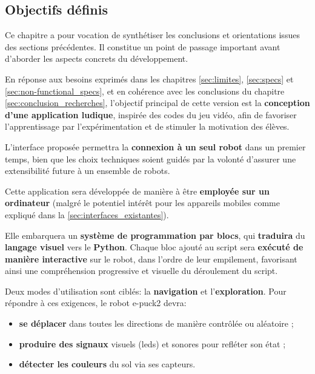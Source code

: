 \subsection{Objectifs définis} \label{sec:objectifs_finaux}

Ce chapitre a pour vocation de synthétiser les conclusions et orientations issues des sections précédentes. 
Il constitue un point de passage important avant d’aborder les aspects concrets du développement.

En réponse aux besoins exprimés dans les chapitres \ref{sec:limites}, \ref{sec:specs} et \ref{sec:non-functional_specs}, et en cohérence avec les conclusions du chapitre \ref{sec:conclusion_recherches}, l’objectif principal de cette version est la \textbf{conception d’une application ludique}, inspirée des codes du jeu vidéo, afin de favoriser l’apprentissage par l’expérimentation et de stimuler la motivation des élèves.

L’interface proposée permettra la \textbf{connexion à un seul robot} dans un premier temps, bien que les choix techniques soient guidés par la volonté d’assurer une extensibilité future à un ensemble de robots.

Cette application sera développée de manière à être \textbf{employée sur un ordinateur} (malgré le potentiel intérêt pour les appareils mobiles comme expliqué dans la \autoref{sec:interfaces_existantes}).

Elle embarquera un \textbf{système de programmation par blocs}, qui \textbf{traduira} du \textbf{langage visuel} vers le \textbf{Python}.
Chaque bloc ajouté au script sera \textbf{exécuté de manière interactive} sur le robot, dans l’ordre de leur empilement, favorisant ainsi une compréhension progressive et visuelle du déroulement du script.

Deux modes d’utilisation sont ciblés: la \textbf{navigation} et l’\textbf{exploration}. 
Pour répondre à ces exigences, le robot e-puck2 devra:
\begin{itemize}
    \item \textbf{se déplacer} dans toutes les directions de manière contrôlée ou aléatoire ;
    \item \textbf{produire des signaux} visuels (\acrshort{led}s) et sonores pour refléter son état ;
    \item \textbf{détecter les couleurs} du sol via ses capteurs.
\end{itemize}

